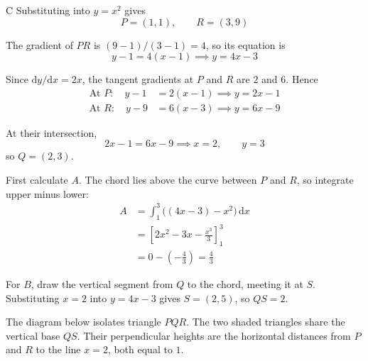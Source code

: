 \documentclass[11pt,a4paper]{article}
\begin{document}
\begin{enumerate}[label=\textbf{\arabic*.},leftmargin=*,itemsep=0pt,start=13]
\begin{djsSolution}{C}
Substituting into $y=x^2$ gives
\[
P=(1,1),\qquad R=(3,9)
\]

The gradient of $PR$ is $(9-1)/(3-1)=4$, so its equation is
\[
y-1=4(x-1)\implies y=4x-3
\]

Since $\mathrm{d}y/\mathrm{d}x=2x$, the tangent gradients at $P$ and $R$ are $2$ and $6$. Hence
\[
\begin{aligned}
\text{At }P:\quad y-1&=2(x-1)\implies y=2x-1\\[5pt]
\text{At }R:\quad y-9&=6(x-3)\implies y=6x-9
\end{aligned}
\]

At their intersection,
\[
2x-1=6x-9\implies x=2,\qquad y=3
\]
so $Q=(2,3)$.

First calculate $A$. The chord lies above the curve between $P$ and $R$, so integrate upper minus lower:
\[
\begin{aligned}
A&=\int_1^3\bigl((4x-3)-x^2\bigr)\,\mathrm{d}x\\[8pt]
&=\left[2x^2-3x-\frac{x^3}{3}\right]_1^3\\[8pt]
&=0-\left(-\frac43\right)=\frac43
\end{aligned}
\]

For $B$, draw the vertical segment from $Q$ to the chord, meeting it at $S$. Substituting $x=2$ into $y=4x-3$ gives $S=(2,5)$, so $QS=2$.

The diagram below isolates triangle $PQR$. The two shaded triangles share the vertical base $QS$. Their perpendicular heights are the horizontal distances from $P$ and $R$ to the line $x=2$, both equal to $1$.

\begin{djsSolutionFigure}
\end{djsSolutionFigure}
\end{djsSolution}
\end{enumerate}
\end{document}
